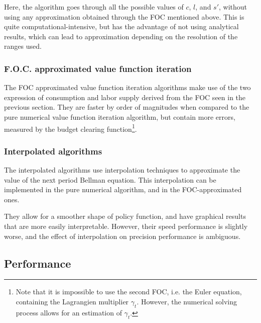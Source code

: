 \documentclass{article}
\begin{document}
Here, the algorithm goes through all the possible values of
$c$, $l$, and $s'$, without using any approximation obtained 
through the FOC mentioned above. 
This is quite computational-intensive, but 
has the advantage of not using analytical results, 
which can lead to approximation depending on the resolution of the 
ranges used.

\subsubsection{F.O.C. approximated value function iteration}

The FOC approximated value function iteration algorithms
make use of the two expression of consumption and labor supply 
derived from the FOC
seen in the previous section. 
They are faster by order of magnitudes when compared to the pure numerical 
value function iteration algorithm,
but contain more errors, measured by the budget clearing function\footnote{Note that it is impossible to use the second FOC, i.e. the 
Euler equation, containing the 
Lagrangien multiplier $\gamma_{t}$. 
However, the numerical solving process 
allows for an estimation of $\gamma_{t}$.}.

\subsubsection{Interpolated algorithms}

The interpolated algorithms 
use interpolation techniques to approximate 
the value of the next period Bellman equation. 
This interpolation can be implemented in the pure numerical 
algorithm, and in the FOC-approximated ones. 

They allow for a smoother shape of policy function, 
and have graphical results that are more easily interpretable.
However, their speed
performance is slightly worse, 
and the effect of interpolation on precision
performance is ambiguous. 

% 

\subsection{Performance}
\end{document}
